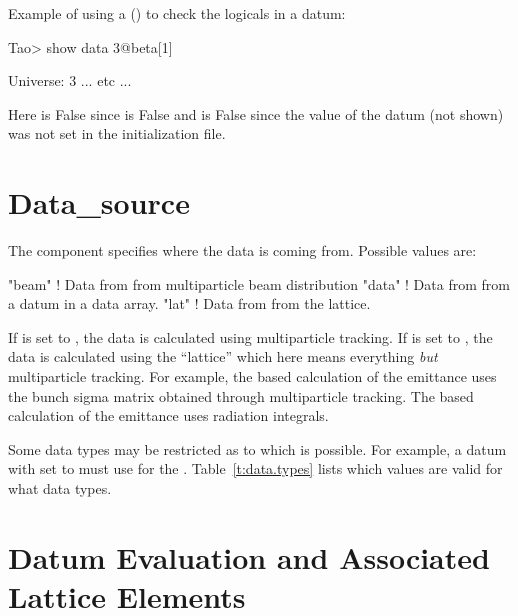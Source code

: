 Example of using a  () to check the logicals
in a datum:
\begin{example}
  Tao> show data 3@beta[1]

  Universe:   3
      ... etc ...
\end{example}
Here  is False since  is False and
 is False since the  value of the datum (not
shown) was not set in the \tao initialization file.

\section{Data_source}
\label{s:data.source}

The  component specifies where the data is 
coming from. Possible values are:
\begin{example}
  "beam"        ! Data from from multiparticle beam distribution
  "data"        ! Data from from a \tao datum in a data array.
  "lat"         ! Data from from the lattice.
\end{example}
If  is set to , the data is calculated
using multiparticle tracking.  If  is set to
, the data is calculated using the ``lattice'' which here
means everything {\em but} multiparticle tracking.  For example, the
 based calculation of the emittance uses the bunch sigma
matrix obtained through multiparticle tracking. The  based
calculation of the emittance uses radiation integrals.

Some data types may be restricted as to which  is
possible. For example, a datum with  set to
 must use  for the . 
Table~\ref{t:data.types} lists which  values are valid
for what data types.

\section{Datum Evaluation and Associated Lattice Elements}
\label{s:data.lat.ele}

